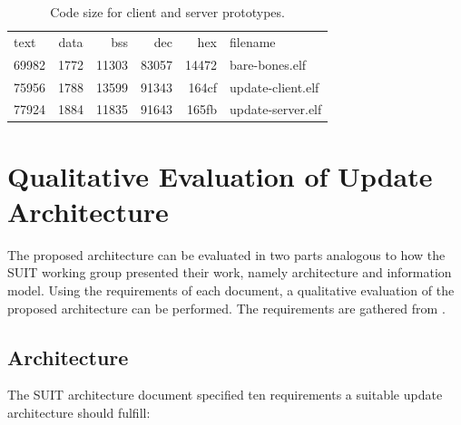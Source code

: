 \documentclass[0-thesis.tex]{subfiles}
\begin{document}
\begin{table}[h!]
\begin{tabular}{l c r r r l}
text	&  data	 &  bss	 &  dec	 &  hex&filename\\
69982	&  1772	 &11303	 &83057	 &14472&bare-bones.elf\\
75956	&  1788	 &13599	 &91343	 &164cf&update-client.elf\\
77924	&  1884	 &11835	 &91643	 &165fb&update-server.elf
\end{tabular}
\caption{Code size for client and server prototypes.}
\label{tab:code-size}
\end{table}

\section{Qualitative Evaluation of Update Architecture}
\label{sec:qual-evaluation}
The proposed architecture can be evaluated in two parts analogous to how the SUIT working
group presented their work, namely architecture and information model. Using the
requirements of each document, a qualitative evaluation of the proposed architecture can
be performed. The requirements are gathered from \parencite{suit-architecture,
suit-information-model}.
\subsection{Architecture}
\label{ssec:arch-evaluation}
The SUIT architecture document specified ten requirements a suitable update architecture
should fulfill:
\end{document}
